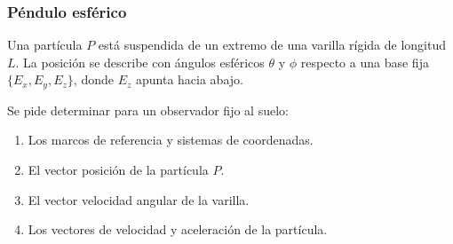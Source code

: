 \subsubsection{Péndulo esférico}

Una partícula $P$ está suspendida de un extremo de una varilla rígida de longitud $L$. La posición se describe con ángulos esféricos $\theta$ y $\phi$ respecto a una base fija $\{E_x, E_y, E_z\}$, donde $E_z$ apunta hacia abajo.

Se pide determinar para un observador fijo al suelo:
\begin{enumerate}
    \item Los marcos de referencia y sistemas de coordenadas.
    \item El vector posición de la partícula $P$.
    \item El vector velocidad angular de la varilla.
    \item Los vectores de velocidad y aceleración de la partícula.
\end{enumerate}


